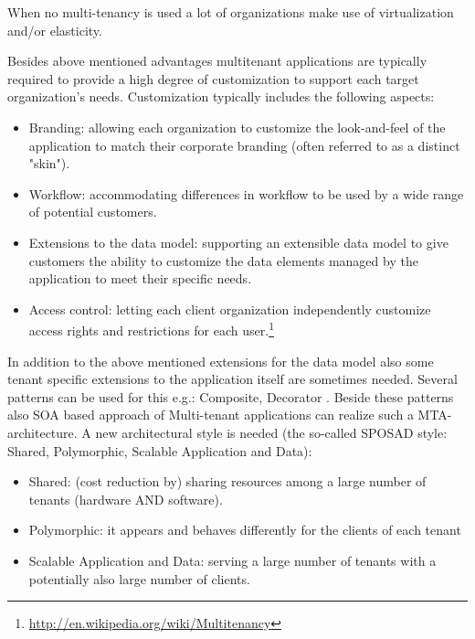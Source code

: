 When no multi-tenancy is used a lot of organizations make use of virtualization and/or elasticity.


\begin{center}
   
\end{center}

Besides above mentioned advantages multitenant applications are typically required to provide a high degree of customization to support each target organization's needs. Customization typically includes the following aspects:
\begin{itemize}
  \item Branding: allowing each organization to customize the look-and-feel of the application to match their corporate branding (often referred to as a distinct "skin").
	\item Workflow: accommodating differences in workflow to be used by a wide range of potential customers.
	\item Extensions to the data model: supporting an extensible data model to give customers the ability to customize the data elements managed by the application to meet their specific needs.
	\item Access control: letting each client organization independently customize access rights and restrictions for each user.\footnote{\url{http://en.wikipedia.org/wiki/Multitenancy}}
\end{itemize}

In addition to the above mentioned extensions for the data model also some tenant specific extensions to the application itself are sometimes needed. Several patterns can be used for this e.g.: {\sc Composite, Decorator} \cite{Gamma95}. Beside these patterns also SOA based approach of Multi-tenant applications can realize such a MTA-architecture.
A new architectural style is needed (the so-called SPOSAD style: Shared, Polymorphic, Scalable Application and Data):

\begin{itemize}
	\item Shared: (cost reduction by) sharing resources among a large
number of tenants (hardware AND software).
	\item Polymorphic: it appears and behaves differently for the clients of each tenant
	\item Scalable Application and Data: serving a large number of tenants with a potentially also large number of clients.
\end{itemize}

